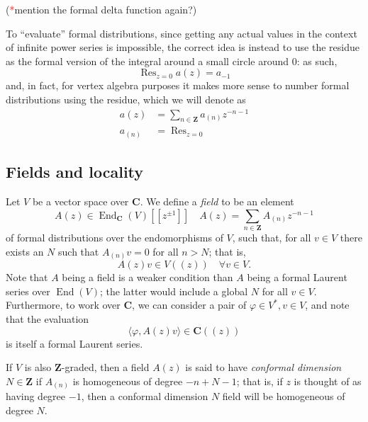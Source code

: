 \documentclass{article}
\newcommand{\CC}{\mathbold{C}}
\newcommand{\ZZ}{\mathbold{Z}}
\newcommand{\tk}{\textcolor{red}{*}}
\DeclareMathOperator{\Res}{Res}
\DeclareMathOperator{\End}{End}
\begin{document}
(\tk mention the formal delta function again?)

To ``evaluate'' formal distributions, since getting any actual values in the context of infinite power series is impossible, the correct idea is instead to use the residue as the formal version of the integral around a small circle around $0$: as such, 
\[\Res_{z=0}a(z)=a_{-1} \]
and, in fact, for vertex algebra purposes it makes more sense to number formal distributions using the residue, which we will denote as
\begin{align*}
  a(z)&=\sum_{n \in \ZZ}a_{(n)}z^{-n-1}\\
  a_{(n)}&=\Res_{z=0}
\end{align*}

\subsection{Fields and locality}
Let $V$ be a vector space over $\CC$.  We define a \textit{field} to be an element
\[A(z) \in \End_\CC(V)[[z^{\pm 1}]] \quad A(z)=\sum_{n \in \ZZ} A_{(n)}z^{-n-1} \]
of formal distributions over the endomorphisms of $V$, such that, for all $v \in V$ there exists an $N$ such that $A_{(n)}v=0$ for all $n>N$; that is, 
\[A(z)v \in V((z)) \quad \forall v \in V. \]
Note that $A$ being a field is a weaker condition than $A$ being a formal Laurent series over $\End(V)$; the latter would include a global $N$ for all $v \in V$.  Furthermore, to work over $\CC$, we can consider a pair of $\varphi \in V^*, v \in V$, and note that the evaluation
\[\langle \varphi, A(z)v \rangle \in \CC((z)) \]
is itself a formal Laurent series.

If $V$ is also $\ZZ$-graded, then a field $A(z)$ is said to have \textit{conformal dimension} $N \in \ZZ$ if $A_{(n)}$ is homogeneous of degree $-n+N-1$; that is, if $z$ is thought of as having degree $-1$, then a conformal dimension $N$ field will be homogeneous of degree $N$.
\end{document}
